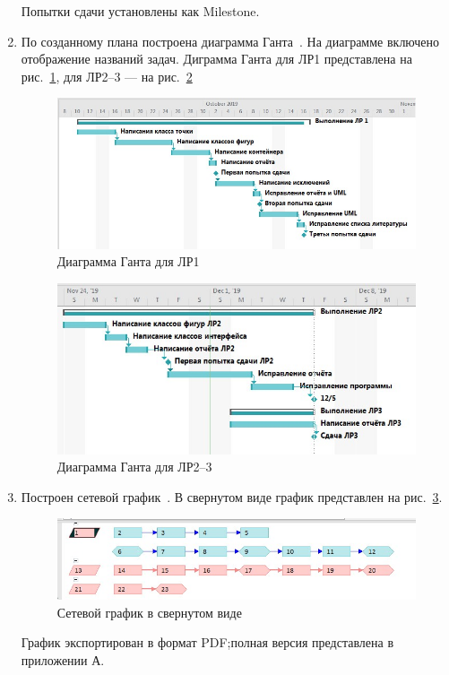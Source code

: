 \documentclass[a4paper, 14pt]{extarticle}
\begin{document}
\begin{enumerate}
    Попытки сдачи установлены как Milestone.

    \item По созданному плана построена диаграмма Ганта~\cite{clark2015gantt}. На диаграмме включено отображение названий задач. Диграмма Ганта для ЛР1 представлена на рис.~\ref{img:gantt1}, для ЛР2--3 --- на рис.~\ref{img:gantt2}

    \begin{figure}[h]
        \centering
        \includegraphics[width=\textwidth]{img/S003.jpg}
        \caption{Диаграмма Ганта для ЛР1}%
        \label{img:gantt1}
    \end{figure}
    
    \begin{figure}[h]
        \centering
        \includegraphics[width=\textwidth]{img/S004.jpg}
        \caption{Диаграмма Ганта для ЛР2--3}%
        \label{img:gantt2}
    \end{figure}
    
    \FloatBarrier{}
    
    \item Построен сетевой график~\cite{lockyer2005project}. В свернутом виде график представлен на рис.~\ref{img:network}.

    \begin{figure}[h]
        \centering
        \includegraphics[width=\textwidth]{img/S005.jpg}
        \caption{Сетевой график в свернутом виде}%
        \label{img:network}
    \end{figure}
    
    График экспортирован в формат PDF;\@ полная версия представлена в приложении А.
\end{enumerate}
\end{document}
